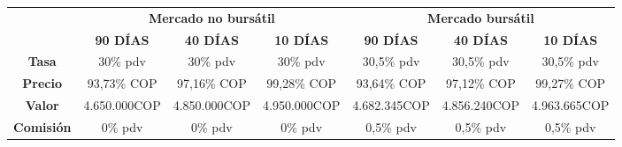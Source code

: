 \begin{center}
\renewcommand{\arraystretch}{1.5} %
\setlength{\tabcolsep}{1pt} %
\begin{tabular}{|c|c|c|c|c|c|c|}
\hline
\multirow{2}{*}{} & \multicolumn{3}{|c|}{\textbf{Mercado no bursátil}}  & \multicolumn{3}{|c|}{\textbf{Mercado bursátil}} \\
\cline{2-7}
& \textbf{90 DÍAS} & \textbf{40 DÍAS} & \textbf{10 DÍAS} & \textbf{90 DÍAS} & \textbf{40 DÍAS} & \textbf{10 DÍAS} \\
\cline{1-7}
\textbf{Tasa} & 30\% pdv & 30\% pdv & 30\% pdv & 30,5\% pdv & 30,5\% pdv & 30,5\% pdv \\
\hline
\textbf{Precio} & 93,73\% COP & 97,16\% COP & 99,28\% COP & 93,64\% COP & 97,12\% COP & 99,27\% COP \\
\hline
\textbf{Valor} & 4.650.000COP & 4.850.000COP & 4.950.000COP & 4.682.345COP & 4.856.240COP & 4.963.665COP \\
\hline
\textbf{Comisión} & 0\% pdv & 0\% pdv & 0\% pdv & 0,5\% pdv & 0,5\% pdv & 0,5\% pdv \\
\hline
\end{tabular}
\end{center}
